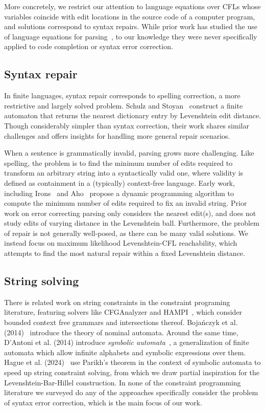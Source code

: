 \documentclass[sigplan,review,acmsmall,nonacm,screen,anonymous]{acmart}\settopmatter{printfolios=false,printccs=false,printacmref=false}
\begin{document}
More concretely, we restrict our attention to language equations over CFLs whose variables coincide with edit locations in the source code of a computer program, and solutions correspond to syntax repairs. While prior work has studied the use of language equations for parsing~\cite{might2011parsing}, to our knowledge they were never specifically applied to code completion or syntax error correction.

\subsection{Syntax repair}

In finite languages, syntax repair corresponds to spelling correction, a more restrictive and largely solved problem. Schulz and Stoyan~\cite{schulz2002fast} construct a finite automaton that returns the nearest dictionary entry by Levenshtein edit distance. Though considerably simpler than syntax correction, their work shares similar challenges and offers insights for handling more general repair scenarios.

When a sentence is grammatically invalid, parsing grows more challenging. Like spelling, the problem is to find the minimum number of edits required to transform an arbitrary string into a syntactically valid one, where validity is defined as containment in a (typically) context-free language. Early work, including Irons~\cite{irons1963error} and Aho~\cite{aho1972minimum} propose a dynamic programming algorithm to compute the minimum number of edits required to fix an invalid string. Prior work on error correcting parsing only considers the nearest edit(s), and does not study edits of varying distance in the Levenshtein ball. Furthermore, the problem of repair is not generally well-posed, as there can be many valid solutions. We instead focus on maximum likelihood Levenshtein-CFL reachability, which attempts to find the most natural repair within a fixed Levenshtein distance.

\subsection{String solving}

There is related work on string constraints in the constraint programing literature, featuring solvers like CFGAnalyzer and HAMPI~\cite{kiezun2009hampi}, which consider bounded context free grammars and intersections thereof. Boja{\'n}czyk et al. (2014)~\cite{bojanczyk2014automata} introduce the theory of nominal automata. Around the same time, D'Antoni et al. (2014) introduce \textit{symbolic automata}~\cite{dantoni2014minimization}, a generalization of finite automata which allow infinite alphabets and symbolic expressions over them. Hague et al. (2024)~\cite{hague2024parikh} use Parikh's theorem in the context of symbolic automata to speed up string constraint solving, from which we draw partial inspiration for the Levenshtein-Bar-Hillel construction. In none of the constraint programming literature we surveyed do any of the approaches specifically consider the problem of syntax error correction, which is the main focus of our work.
\end{document}
